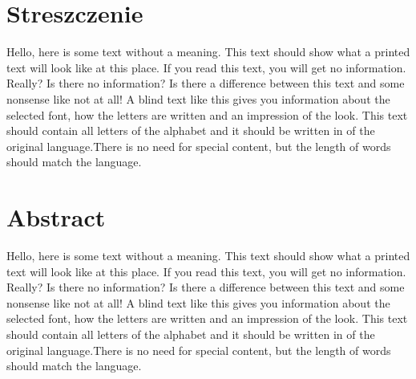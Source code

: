 \section*{Streszczenie}
Hello, here is some text without a meaning.  This text should show what
a printed text will look like at this place.  If you read this text,
you will get no information.  Really?  Is there no information?  Is there
a difference between this text and some nonsense like not at all!  A
blind text like this gives you information about the selected font, how
the letters are written and an impression of the look.  This text should
contain all letters of the alphabet and it should be written in of the
original language.There is no need for special content, but the length of
words should match the language.

\section*{Abstract}
Hello, here is some text without a meaning.  This text should show what
a printed text will look like at this place.  If you read this text,
you will get no information.  Really?  Is there no information?  Is there
a difference between this text and some nonsense like not at all!  A
blind text like this gives you information about the selected font, how
the letters are written and an impression of the look.  This text should
contain all letters of the alphabet and it should be written in of the
original language.There is no need for special content, but the length of
words should match the language.